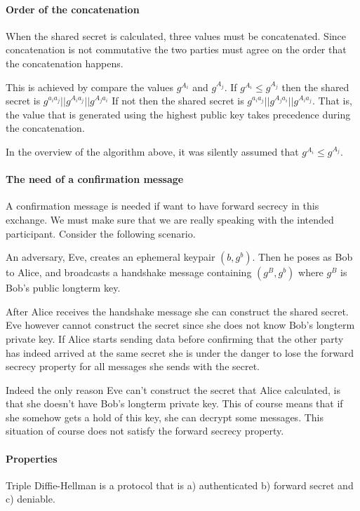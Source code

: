 \paragraph{Order of the concatenation}
When the shared secret is calculated, three values must be concatenated. Since
concatenation is not commutative the two parties must agree on the order that the
concatenation happens.

This is achieved by compare the values $g^{A_i}$ and $g^{A_j}$. If
$g^{A_i} \le g^{A_j}$ then the shared secret is $g^{a_ia_j} || g^{A_ia_j} || g^{A_ja_i}$
If not then the shared secret is $g^{a_ia_j} || g^{A_ja_i} || g^{A_ia_j}$. That is, the
value that is generated using the highest public key takes precedence during the
concatenation.

In the overview of the algorithm above, it was silently assumed that
$g^{A_i} \le g^{A_j}$.

\paragraph{The need of a confirmation message}
\label{confirm_message_explain}
A confirmation message is needed if want to have forward secrecy in this exchange.
We must make sure that we are really speaking with the intended participant. Consider
the following scenario.

An adversary, Eve, creates an ephemeral keypair $(b, g^b)$. Then he poses as Bob to Alice,
and broadcasts a handshake message containing $(g^B,g^b)$ where $g^B$ is Bob's
public longterm key.

After Alice receives the handshake message she can construct the shared secret. Eve
however cannot construct the secret since she does not know Bob's longterm
private key. If Alice starts sending data before confirming that the other party
has indeed arrived at the same secret she is under the danger to lose the forward
secrecy property for all messages she sends with the secret.

Indeed the only reason Eve can't construct the secret that Alice calculated, is
that she doesn't have Bob's longterm private key. This of course means that if
she somehow gets a hold of this key, she can decrypt some messages. This situation
of course does not satisfy the forward secrecy property.


\paragraph{Properties}
Triple Diffie-Hellman is a protocol that is a) authenticated b) forward secret
and c) deniable.

